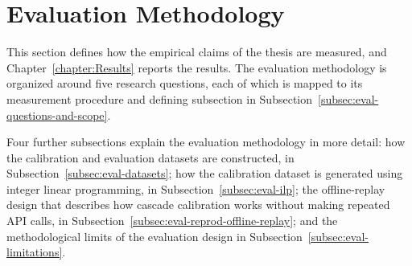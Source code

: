 \section{Evaluation Methodology}\label{section:Evaluation_Methodology}

\makeatletter
{}
\makeatother

This section defines how the empirical claims of the thesis are measured, and Chapter~\ref{chapter:Results} reports the results. The evaluation methodology is organized around five research questions, each of which is mapped to its measurement procedure and defining subsection in Subsection~\ref{subsec:eval-questions-and-scope}.

Four further subsections explain the evaluation methodology in more detail: how the calibration and evaluation datasets are constructed, in Subsection~\ref{subsec:eval-datasets}; how the calibration dataset is generated using integer linear programming, in Subsection~\ref{subsec:eval-ilp}; the offline-replay design that describes how cascade calibration works without making repeated API calls, in Subsection~\ref{subsec:eval-reprod-offline-replay}; and the methodological limits of the evaluation design in Subsection~\ref{subsec:eval-limitations}.










